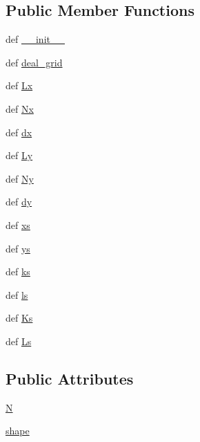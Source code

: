 \subsection*{Public Member Functions}
\begin{DoxyCompactItemize}
\item 
def \hyperlink{classDropbox_1_1ThreeLayerModel_1_1TLM_1_1Stat2Dgrid_afced9078b9ebb338cf87ba3e68763e4f}{\+\_\+\+\_\+init\+\_\+\+\_\+}
\item 
def \hyperlink{classDropbox_1_1ThreeLayerModel_1_1TLM_1_1Stat2Dgrid_a087ebd46b502ba4b9b2ceba013c33b8f}{deal\+\_\+grid}
\item 
def \hyperlink{classDropbox_1_1ThreeLayerModel_1_1TLM_1_1Stat2Dgrid_a1afaffc5d3efb2e17cf7ca9db73f96d9}{Lx}
\item 
def \hyperlink{classDropbox_1_1ThreeLayerModel_1_1TLM_1_1Stat2Dgrid_ab89945446b9ec0622ad9630cc69f2c20}{Nx}
\item 
def \hyperlink{classDropbox_1_1ThreeLayerModel_1_1TLM_1_1Stat2Dgrid_a81a22df02ddb59a6697134983b0b0546}{dx}
\item 
def \hyperlink{classDropbox_1_1ThreeLayerModel_1_1TLM_1_1Stat2Dgrid_ab35fbcebe95088310113a5c4b1c90e93}{Ly}
\item 
def \hyperlink{classDropbox_1_1ThreeLayerModel_1_1TLM_1_1Stat2Dgrid_ad7a6cb9f101337c5be4be85a77ef247b}{Ny}
\item 
def \hyperlink{classDropbox_1_1ThreeLayerModel_1_1TLM_1_1Stat2Dgrid_af3dae1886f9c49d727f3ef20597b1c07}{dy}
\item 
def \hyperlink{classDropbox_1_1ThreeLayerModel_1_1TLM_1_1Stat2Dgrid_a08517084b949c20abf02682d152e4be4}{xs}
\item 
def \hyperlink{classDropbox_1_1ThreeLayerModel_1_1TLM_1_1Stat2Dgrid_a69829a41de65ba8a9cfb863ef59c36f0}{ys}
\item 
def \hyperlink{classDropbox_1_1ThreeLayerModel_1_1TLM_1_1Stat2Dgrid_a0bbed914ae14479a5877a53d67bf6f8e}{ks}
\item 
def \hyperlink{classDropbox_1_1ThreeLayerModel_1_1TLM_1_1Stat2Dgrid_a46a752603c67d59cfa1b6e1906df708e}{ls}
\item 
def \hyperlink{classDropbox_1_1ThreeLayerModel_1_1TLM_1_1Stat2Dgrid_a8e78f819e94731eb0517c6474050a67d}{Ks}
\item 
def \hyperlink{classDropbox_1_1ThreeLayerModel_1_1TLM_1_1Stat2Dgrid_ac02ca40969b216f834de562b26c5467c}{Ls}
\end{DoxyCompactItemize}
\subsection*{Public Attributes}
\begin{DoxyCompactItemize}
\item 
\hyperlink{classDropbox_1_1ThreeLayerModel_1_1TLM_1_1Stat2Dgrid_a927e58252be86748a3fd5a19175f3d26}{N}
\item 
\hyperlink{classDropbox_1_1ThreeLayerModel_1_1TLM_1_1Stat2Dgrid_ae994d2a0fae4d8cafa40ed7b6bc19742}{shape}
\end{DoxyCompactItemize}


